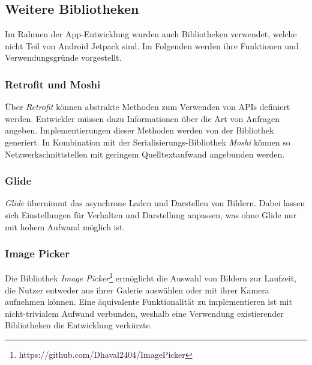 \documentclass[a4paper, 11pt]{article}
\begin{document}
\subsection{Weitere Bibliotheken}
\label{subsec:app:bibs}

Im Rahmen der App-Entwicklung wurden auch Bibliotheken verwendet, welche nicht Teil von Android Jetpack sind.
Im Folgenden werden ihre Funktionen und Verwendungsgründe vorgestellt.

\subsubsection{Retrofit und Moshi}
\label{subsubsec:app:bibs:retrofitmoshi}

Über \textit{Retrofit} können abstrakte Methoden zum Verwenden von APIs definiert werden.
Entwickler müssen dazu Informationen über die Art von Anfragen angeben.
Implementierungen dieser Methoden werden von der Bibliothek generiert.
In Kombination mit der Serialisierungs-Bibliothek \textit{Moshi} können so Netzwerkschnittstellen mit geringem Quelltextaufwand angebunden werden.

\subsubsection{Glide}
\label{subsubsec:app:bibs:glide}

\textit{Glide} übernimmt das asynchrone Laden und Darstellen von Bildern.
Dabei lassen sich Einstellungen für Verhalten und Darstellung anpassen, was ohne Glide nur mit hohem Aufwand möglich ist.

\subsubsection{Image Picker}
\label{subsubsec:app:bibs:imagepicker}

Die Bibliothek \textit{Image Picker}\footnote{https://github.com/Dhaval2404/ImagePicker} ermöglicht die Auswahl von Bildern zur Laufzeit, die Nutzer entweder aus ihrer Galerie auswählen oder mit ihrer Kamera aufnehmen können.
Eine äquivalente Funktionalität zu implementieren ist mit nicht-trivialem Aufwand verbunden, weshalb eine Verwendung existierender Bibliotheken die Entwicklung verkürzte.
\end{document}
